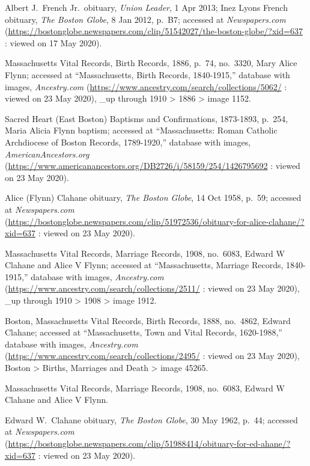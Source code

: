 \begin{thebibliography}{999}
Albert J.\ French Jr.\ obituary, \textit{Union Leader}, 1 Apr 2013; Inez Lyons French obituary, \textit{The Boston Globe}, 8 Jan 2012, p.\ B7; accessed at \textit{Newspapers.com} (\url{https://bostonglobe.newspapers.com/clip/51542027/the-boston-globe/?xid=637} : viewed on 17 May 2020).


Massachusetts Vital Records, Birth Records, 1886, p.\ 74, no.\ 3320, Mary Alice Flynn; accessed at ``Massachusetts, Birth Records, 1840-1915,'' database with images, \textit{Ancestry.com} (\url{https://www.ancestry.com/search/collections/5062/} : viewed on 23 May 2020), \_up through 1910 > 1886 > image 1152.

Sacred Heart (East Boston) Baptisms and Confirmations, 1873-1893, p.\ 254, Maria Alicia Flynn baptism; accessed at ``Massachusetts: Roman Catholic Archdiocese of Boston Records, 1789-1920,'' database with images, \textit{AmericanAncestors.org} (\url{https://www.americanancestors.org/DB2726/i/58159/254/1426795692} : viewed on 23 May 2020).

Alice (Flynn) Clahane obituary, \textit{The Boston Globe}, 14 Oct 1958, p.\ 59; accessed at \textit{Newspapers.com} (\url{https://bostonglobe.newspapers.com/clip/51972536/obituary-for-alice-clahane/?xid=637} : viewed on 23 May 2020).

Massachusetts Vital Records, Marriage Records, 1908, no.\ 6083, Edward W Clahane and Alice V Flynn; accessed at ``Massachusetts, Marriage Records, 1840-1915,'' database with images, \textit{Ancestry.com} (\url{https://www.ancestry.com/search/collections/2511/} : viewed on 23 May 2020), \_up through 1910 > 1908 > image 1912.

Boston, Massachusetts Vital Records, Birth Records, 1888, no.\ 4862, Edward Clahane; accessed at ``Massachusetts, Town and Vital Records, 1620-1988,'' database with images, \textit{Ancestry.com} (\url{https://www.ancestry.com/search/collections/2495/} : viewed on 23 May 2020), Boston > Births, Marriages and Death > image 45265.

Massachusetts Vital Records, Marriage Records, 1908, no.\ 6083, Edward W Clahane and Alice V Flynn.

Edward W.\ Clahane obituary, \textit{The Boston Globe}, 30 May 1962, p.\ 44; accessed at \textit{Newspapers.com} (\url{https://bostonglobe.newspapers.com/clip/51988414/obituary-for-ed-ahane/?xid=637} : viewed on 23 May 2020).


\end{thebibliography}
